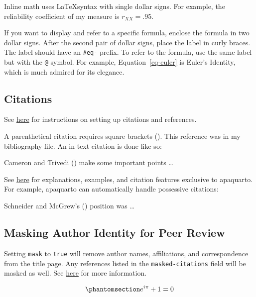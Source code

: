 \documentclass[
  jou,
  floatsintext,
  longtable,
  nolmodern,
  notxfonts,
  notimes,
  colorlinks=true,linkcolor=blue,citecolor=blue,urlcolor=blue]{apa7}
\begin{document}
Inline math uses \LaTeX syntax with single dollar signs. For example,
the reliability coefficient of my measure is \(r_{XX}=.95\).

If you want to display and refer to a specific formula, enclose the
formula in two dollar signs. After the second pair of dollar signs,
place the label in curly braces. The label should have an \texttt{\#eq-}
prefix. To refer to the formula, use the same label but with the
\texttt{@} symbol. For example, Equation~\ref{eq-euler} is Euler's
Identity, which is much admired for its elegance.

\subsection{Citations}\label{citations}

See
\href{https://quarto.org/docs/authoring/footnotes-and-citations.html}{here}
for instructions on setting up citations and references.

A parenthetical citation requires square brackets
(). This
reference was in my bibliography file. An in-text citation is done like
so:

Cameron and Trivedi () make some
important points \ldots{}

See
\href{https://wjschne.github.io/apaquarto/writing.html\#references}{here}
for explanations, examples, and citation features exclusive to
apaquarto. For example, apaquarto can automatically handle possessive
citations:

Schneider and McGrew's ()
position was \ldots{}

\subsection{Masking Author Identity for Peer
Review}\label{masking-author-identity-for-peer-review}

Setting \texttt{mask} to \texttt{true} will remove author names,
affiliations, and correspondence from the title page. Any references
listed in the \texttt{masked-citations} field will be masked as well.
See
\href{https://wjschne.github.io/apaquarto/writing.html\#masked-citations-for-anonymous-peer-review}{here}
for more information.

\begin{equation}\phantomsection\label{eq-euler}{
e^{i\pi}+1=0
}\end{equation}
\end{document}
